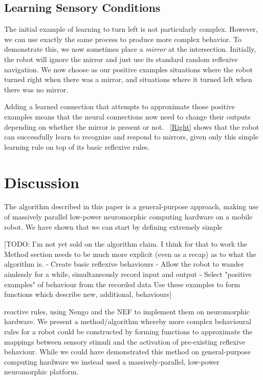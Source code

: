 \documentclass[conference]{IEEEtran}
\begin{document}
\subsection{Learning Sensory Conditions}

The initial example of learning to turn left is not particularly complex. 
However, we can use exactly the same process to produce more complex behavior.
To demonstrate this, we now sometimes place a \textit{mirror} at the intersection.
Initially, the robot will ignore the mirror and just use its standard random
reflexive navigation.  We now choose as our positive examples situations where
the robot turned right when there was a mirror, and situations where it turned
left when there was no mirror.

Adding a learned connection that attempts to approximate those positive
examples means that the neural connections now need to change their outputs
depending on whether the mirror is present or not.  \figurename~\ref{Right} shows 
that the robot can successfully learn to recognize and respond to mirrors,
given only this simple learning rule on top of its basic reflexive rules.

\section{Discussion}
The algorithm described in this paper is a general-purpose approach, 
making use of massively parallel low-power neuromorphic computing hardware on 
a mobile robot. We have shown that we can start by defining extremely simple

[TODO: I'm not yet sold on the algorithm claim. I think for that to work the Method section needs to be much more explicit (even as a recap) as to what the algorithm is.
- Create basic reflexive behaviours
- Allow the robot to wander aimlessly for a while, simultaneously record input and output
- Select "positive examples" of behaviour from the recorded data
Use these examples to form functions which describe new, additional, behaviours]
 
reactive rules, using Nengo and the NEF to implement them on neuromorphic 
hardware. We present a method/algorithm whereby more complex behavioural rules for a robot could be constructed by forming functions to approximate the mappings between sensory stimuli and the activation of pre-existing reflexive behaviour. While we could have demonstrated this method on general-purpose computing hardware we instead used a massively-parallel, low-power neuromorphic platform.
\end{document}
